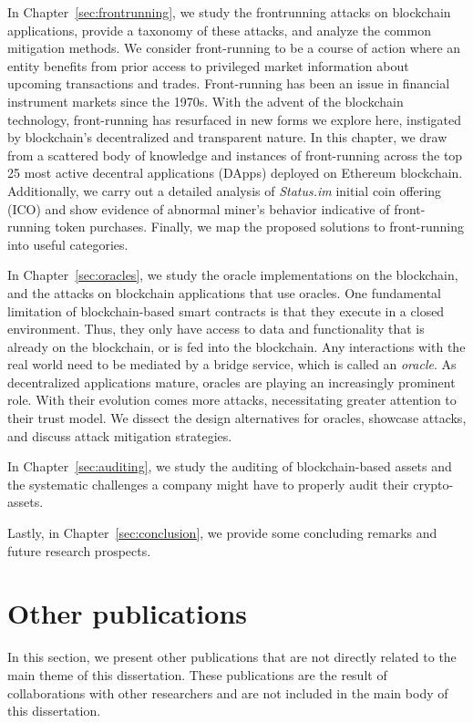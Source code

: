 In Chapter~\ref{sec:frontrunning}, we study the frontrunning attacks on blockchain applications, provide a taxonomy of these attacks, and analyze the common mitigation methods. We consider front-running to be a course of action where an entity benefits from prior access to privileged market information about upcoming transactions and trades. Front-running has been an issue in financial instrument markets since the 1970s. With the advent of the blockchain technology, front-running has resurfaced in new forms we explore here, instigated by blockchain’s decentralized and transparent nature. In this chapter, we draw from a scattered body of knowledge and instances of front-running across the top 25 most active decentral applications (DApps) deployed on Ethereum blockchain. Additionally, we carry out a detailed analysis of \textit{Status.im} initial coin offering (ICO) and show evidence of abnormal miner’s behavior indicative of front-running token purchases. Finally, we map the proposed solutions to front-running into useful categories.


In Chapter~\ref{sec:oracles}, we study the oracle implementations on the blockchain, and the attacks on blockchain applications that use oracles. One fundamental limitation of blockchain-based smart contracts is that they execute in a closed environment. Thus, they only have access to data and functionality that is already on the blockchain, or is fed into the blockchain. Any interactions with the real world need to be mediated by a bridge service, which is called an \textit{oracle}. As decentralized applications mature, oracles are playing an increasingly prominent role. With their evolution comes more attacks, necessitating greater attention to their trust model. We dissect the design alternatives for oracles, showcase attacks, and discuss attack mitigation strategies.


In Chapter~\ref{sec:auditing}, we study the auditing of blockchain-based assets and the systematic challenges a company might have to properly audit their crypto-assets. %


Lastly, in Chapter~\ref{sec:conclusion}, we provide some concluding remarks and future research prospects.


\section{Other publications}
In this section, we present other publications that are not directly related to the main theme of this dissertation. These publications are the result of collaborations with other researchers and are not included in the main body of this dissertation.

